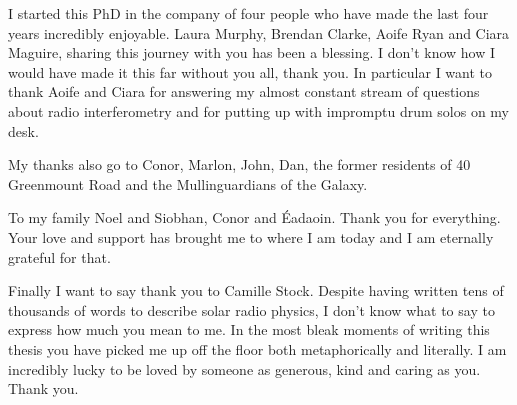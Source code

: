 \begin{acknowledgements}
I started this PhD in the company of four people who have made the last four years incredibly enjoyable. Laura Murphy, Brendan Clarke, Aoife Ryan and Ciara Maguire, sharing this journey with you has been a blessing. I don't know how I would have made it this far without you all, thank you.
In particular I want to thank Aoife and Ciara for answering my almost constant stream of questions about radio interferometry and for putting up with impromptu drum solos on my desk.

My thanks also go to Conor, Marlon, John, Dan, the former residents of 40 Greenmount Road and the Mullinguardians of the Galaxy.

To my family Noel and Siobhan, Conor and \'Eadaoin. Thank you for everything. Your love and support has brought me to where I am today and I am eternally grateful for that.

Finally I want to say thank you to Camille Stock. Despite having written tens of thousands of words to describe solar radio physics, I don't know what to say to express how much you mean to me. In the most bleak moments of writing this thesis you have picked me up off the floor both metaphorically and literally. I am incredibly lucky to be loved by someone as generous, kind and caring as you. Thank you.

\end{acknowledgements}
